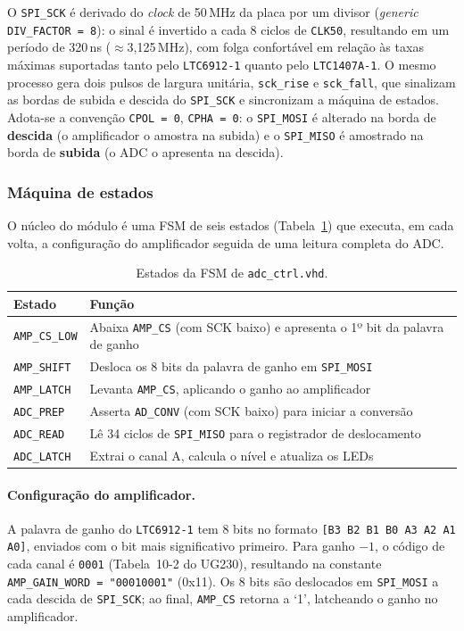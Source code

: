 \documentclass[12pt,a4paper]{article}
\begin{document}
O \texttt{SPI\_SCK} é derivado do \textit{clock} de 50\,MHz da placa por um divisor
(\textit{generic} \texttt{DIV\_FACTOR = 8}): o sinal é invertido a cada 8 ciclos de
\texttt{CLK50}, resultando em um período de 320\,ns ($\approx$3{,}125\,MHz), com folga
confortável em relação às taxas máximas suportadas tanto pelo \texttt{LTC6912-1} quanto pelo
\texttt{LTC1407A-1}. O mesmo processo gera dois pulsos de largura unitária, \texttt{sck\_rise}
e \texttt{sck\_fall}, que sinalizam as bordas de subida e descida do \texttt{SPI\_SCK} e
sincronizam a máquina de estados. Adota-se a convenção \texttt{CPOL = 0}, \texttt{CPHA = 0}:
o \texttt{SPI\_MOSI} é alterado na borda de \textbf{descida} (o amplificador o amostra na
subida) e o \texttt{SPI\_MISO} é amostrado na borda de \textbf{subida} (o ADC o apresenta na
descida).

\subsubsection{Máquina de estados}

O núcleo do módulo é uma FSM de seis estados (Tabela~\ref{tab:fsm}) que executa, em cada
volta, a configuração do amplificador seguida de uma leitura completa do ADC.

\begin{table}[H]
\centering
\begin{tabular}{ll}
\hline
\textbf{Estado} & \textbf{Função} \\
\hline
\texttt{AMP\_CS\_LOW} & Abaixa \texttt{AMP\_CS} (com SCK baixo) e apresenta o 1º bit da palavra de ganho \\
\texttt{AMP\_SHIFT}   & Desloca os 8 bits da palavra de ganho em \texttt{SPI\_MOSI} \\
\texttt{AMP\_LATCH}   & Levanta \texttt{AMP\_CS}, aplicando o ganho ao amplificador \\
\texttt{ADC\_PREP}    & Asserta \texttt{AD\_CONV} (com SCK baixo) para iniciar a conversão \\
\texttt{ADC\_READ}    & Lê 34 ciclos de \texttt{SPI\_MISO} para o registrador de deslocamento \\
\texttt{ADC\_LATCH}   & Extrai o canal A, calcula o nível e atualiza os LEDs \\
\hline
\end{tabular}
\caption{Estados da FSM de \texttt{adc\_ctrl.vhd}.}
\label{tab:fsm}
\end{table}

\paragraph{Configuração do amplificador.}
A palavra de ganho do \texttt{LTC6912-1} tem 8 bits no formato
\texttt{[B3 B2 B1 B0 A3 A2 A1 A0]}, enviados com o bit mais significativo primeiro. Para
ganho $-1$, o código de cada canal é \texttt{0001} (Tabela~10-2 do UG230), resultando na
constante \texttt{AMP\_GAIN\_WORD = "00010001"} (0x11). Os 8 bits são deslocados em
\texttt{SPI\_MOSI} a cada descida de \texttt{SPI\_SCK}; ao final, \texttt{AMP\_CS} retorna a
`1', latcheando o ganho no amplificador.
\end{document}
